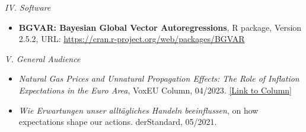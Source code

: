 \documentclass{resume} %
\begin{document}
{\large \itshape IV. Software}
\vspace{0.1cm}
\begin{itemize}
    \par \begingroup \leftskip1em \rightskip2em \vspace*{-0.2cm}
    \item {\bfseries BGVAR: Bayesian Global Vector Autoregressions}, R package, Version 2.5.2, URL: \url{https://cran.r-project.org/web/packages/BGVAR}
    \par \endgroup
\end{itemize}

{\large \itshape V. General Audience}
\vspace{0.1cm}
\begin{itemize}
    \par \begingroup \leftskip1em \rightskip2em \vspace*{-0.2cm}
    \item {\it Natural Gas Prices and Unnatural Propagation Effects: The Role of Inflation Expectations in the Euro Area}, VoxEU Column, 04/2023. \href{https://cepr.org/voxeu/columns/natural-gas-prices-and-unnatural-propagation-effects-role-inflation-expectations-euro}{[Link to Column]}
    \item {\it Wie Erwartungen unser alltägliches Handeln beeinflussen}, on how expectations shape our actions. derStandard, 05/2021.
    \par \endgroup
\end{itemize}
\par \endgroup
\end{document}
